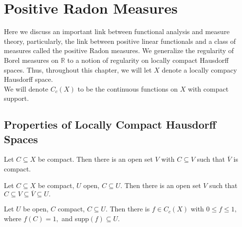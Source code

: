 \chapter{Positive Radon Measures}

Here we discuss an important link between functional analysis and measure theory, particularly, the link between positive linear functionals and a class of measures called the positive Radon measures. We generalize the regularity of Borel measures on $\mathbb{R}$ to a notion of regularity on locally compact Hausdorff spaces. Thus, throughout this chapter, we will let $X$ denote a locally compacy Hausdorff space. \\
We will denote $C_c(X)$ to be the continuous functions on $X$ with compact support.

\section{Properties of Locally Compact Hausdorff Spaces}
\begin{prop}
Let $C\subseteq X$ be compact. Then there is an open set $V$ with $C\subseteq V$ such that $\overline{V}$ is compact. \\
\end{prop}

\begin{prop}
Let $C\subseteq X$ be compact, $U$ open, $C\subseteq U.$ Then there is an open set $V$ such that $C\subseteq V\subseteq \overline{V}\subseteq U.$ \\
\end{prop}

\begin{prop}
Let $U$ be open, $C$ compact, $C\subseteq U.$ Then there is $f\in C_c(X)$ with $0\leq f\leq 1,$ where $f(C)=1,$ and supp$(f)\subseteq U.$ \\
\end{prop}


